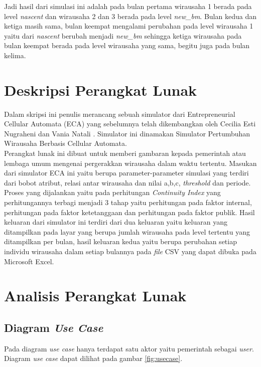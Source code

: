 Jadi hasil dari simulasi ini adalah pada bulan pertama wirausaha 1 berada pada level \textit{nascent} dan wirausaha 2 dan 3 berada pada level \textit{new\_bm}. Bulan kedua dan ketiga masih sama, bulan keempat mengalami perubahan pada level wirausaha 1 yaitu dari \textit{nascent} berubah menjadi \textit{new\_bm} sehingga ketiga wirausaha pada bulan keempat berada pada level wirausaha yang sama, begitu juga pada bulan kelima.
	
\section{Deskripsi Perangkat Lunak}
\label{dpl}

Dalam skripsi ini penulis merancang sebuah simulator dari Entrepreneurial Cellular Automata (ECA) yang sebelumnya telah dikembangkan oleh Cecilia Esti Nugraheni dan Vania Natali \cite{ECA}. Simulator ini dinamakan Simulator Pertumbuhan Wirausaha Berbasis Cellular Automata.\\
Perangkat lunak ini dibuat untuk memberi gambaran kepada pemerintah atau lembaga umum mengenai pergerakkan wirausaha dalam waktu tertentu. Masukan dari simulator ECA ini yaitu berupa parameter-parameter simulasi yang terdiri dari bobot atribut, relasi antar wirausaha dan nilai a,b,c, \textit{threshold} dan periode. Proses yang dijalankan yaitu pada perhitungan \textit{Continuity Index} yang perhitungannya terbagi menjadi 3 tahap yaitu perhitungan pada faktor internal, perhitungan pada faktor ketetanggaan dan perhitungan pada faktor publik. Hasil keluaran dari simulator ini terdiri dari dua keluaran yaitu keluaran yang ditampilkan pada layar yang berupa jumlah wirausaha pada level tertentu yang ditampilkan per bulan, hasil keluaran kedua yaitu berupa perubahan setiap individu wirausaha dalam setiap bulannya pada \textit{file} CSV yang dapat dibuka pada Microsoft Excel.


\section{Analisis Perangkat Lunak}
\label{analisisPL}

\subsection{Diagram \textit{Use Case}}

Pada diagram \textit{use case} hanya terdapat satu aktor yaitu pemerintah sebagai \textit{user}. Diagram \textit{use case} dapat dilihat pada gambar \ref{fig:usecase}.

